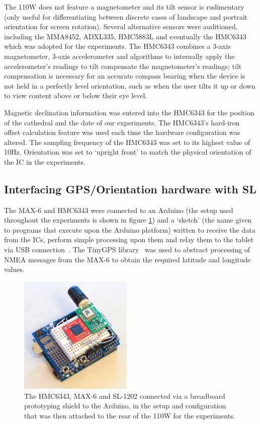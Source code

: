 The 110W does not feature a magnetometer and its tilt sensor is rudimentary (only useful for differentiating between discrete cases of landscape and portrait orientation for screen rotation). Several alternative sensors were auditioned, including the MMA8452, ADXL335, HMC5883L and eventually the HMC6343 which was adopted for the experiments. The HMC6343 combines a 3-axis magnetometer, 3-axis accelerometer and algorithms to internally apply the accelerometer's readings to tilt compensate the magnetometer's readings; tilt compensation is necessary for an accurate compass bearing when the device is not held in a perfectly level orientation, such as when the user tilts it up or down to view content above or below their eye level.

Magnetic declination information was entered into the HMC6343 for the position of the cathedral and the date of our experiments. The HMC6343's hard-iron offset calculation feature was used each time the hardware configuration was altered. The sampling frequency of the HMC6343 was set to its highest value of 10Hz. Orientation was set to `upright front' to match the physical orientation of the IC in the experiments.

\subsection{Interfacing GPS/Orientation hardware with SL}
The MAX-6 and HMC6343 were connected to an Arduino (the setup used throughout the experiments is shown in figure \ref{arduino}) and a `sketch' (the name given to programs that execute upon the Arduino platform) written to receive the data from the ICs, perform simple processing upon them and relay them to the tablet via USB connection~\cite{Davies}. The TinyGPS library~\cite{Hart} was used to abstract processing of NMEA messages from the MAX-6 to obtain the required latitude and longitude values.
 
\begin{figure}[h]
\centering
\includegraphics[width=0.48\textwidth]{images/figure_8}
\caption{The HMC6343, MAX-6 and SL-1202 connected via a breadboard prototyping shield to the Arduino, in the setup and configuration that was then attached to the rear of the 110W for the experiments.}
\label{arduino}
\end{figure}

